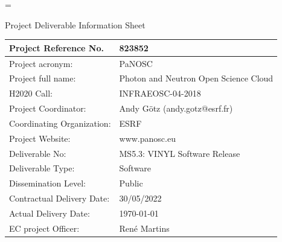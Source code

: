 \documentclass[11pt, a4paper]{article}
\edef\restoreparindent{\parindent=\the\parindent\relax}
\begin{document}
\fancyfoot{} %
\fancyfoot[R]{\thepage}


{ %
\restoreparindent

{\sffamily\huge Project Deliverable Information Sheet \par}

\begin{center}
\begin{tabular}{ | m{5.2cm}| m{10.7cm} | }
\hline
Project Reference No. & 823852 \\
\hline
Project acronym: & PaNOSC \\
\hline
Project full name: & Photon and Neutron Open Science Cloud \\
\hline
H2020 Call: & INFRAEOSC-04-2018 \\
\hline
Project Coordinator: & Andy Götz (andy.gotz@esrf.fr) \\
\hline
Coordinating Organization: & ESRF \\
\hline
Project Website: & www.panosc.eu \\
\hline
Deliverable No: & MS5.3: VINYL Software Release\\
\hline
Deliverable Type: & Software \\
\hline
Dissemination Level: & Public \\
\hline
Contractual Delivery Date: & 30/05/2022 \\
\hline
Actual Delivery Date: & \today \\
\hline
EC project Officer: & Ren\'e Martins \\
\hline
\end{tabular}
\end{center}

}
\end{document}
